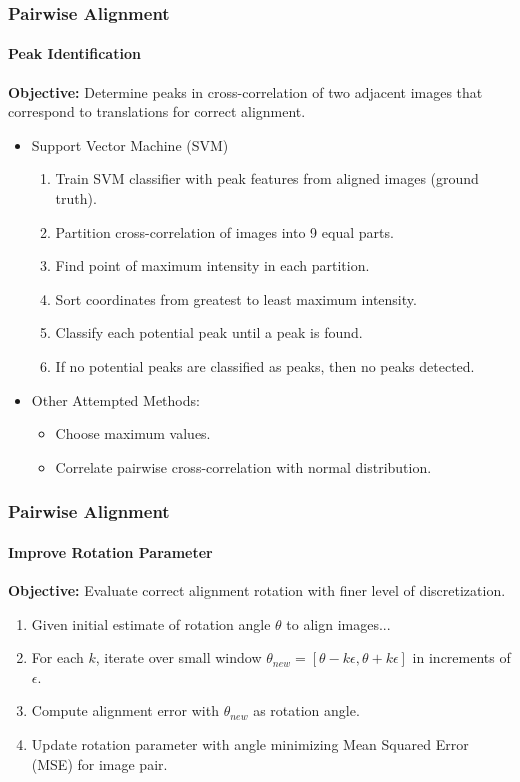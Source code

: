 \documentclass{beamer}
\begin{document}
\begin{frame}
\frametitle{Pairwise Alignment}
\framesubtitle{Peak Identification}
\textbf{Objective:} Determine peaks in cross-correlation of two adjacent images that correspond to translations for correct alignment. \\
\begin{itemize}
\item Support Vector Machine (SVM)
\begin{enumerate}
\item Train SVM classifier with peak features from aligned images (ground truth).
\item Partition cross-correlation of images into 9 equal parts.
\item Find point of maximum intensity in each partition.
\item Sort coordinates from greatest to least maximum intensity.
\item Classify each potential peak until a peak is found.
\item If no potential peaks are classified as peaks, then no peaks detected.
\end{enumerate}
\item Other Attempted Methods:
\begin{itemize}
\item Choose maximum values.
\item Correlate pairwise cross-correlation with normal distribution. 
\end{itemize}
\end{itemize}
\end{frame}

\begin{frame}
\frametitle{Pairwise Alignment}
\framesubtitle{Improve Rotation Parameter} 
\textbf{Objective:} Evaluate correct alignment rotation with finer level of discretization. 
\begin{enumerate}
\item Given initial estimate of rotation angle $\theta$ to align images...
\item For each $k$, iterate over small window $\theta_{new} = [\theta-k\epsilon, \theta+k\epsilon]$ in increments of $\epsilon$.
\item Compute alignment error with $\theta_{new}$ as rotation angle.
\item Update rotation parameter with angle minimizing Mean Squared Error (MSE) for image pair.
\end{enumerate}
\end{frame}
\end{document}
